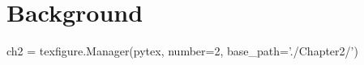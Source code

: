 \label{ch:Background}
\chapter{Background}  %

\begin{pycode}[chapter2]
ch2 = texfigure.Manager(pytex, number=2, base_path='./Chapter2/')
\end{pycode}

%

%
%
%		
%	
	

